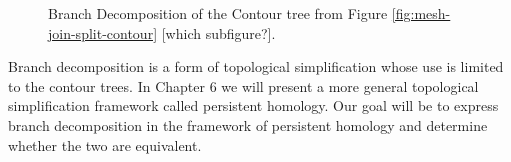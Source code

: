 \begin{figure}%
    \centering
    \caption{Branch Decomposition of the Contour tree from Figure \ref{fig:mesh-join-split-contour} [which subfigure?].}%
    \label{fig:branch-decomp}%
\end{figure}

Branch decomposition is a form of topological simplification whose use is limited to the contour trees. In Chapter 6 we will present a more general topological simplification framework called persistent homology. Our goal will be to express branch decomposition in the framework of persistent homology and determine whether the two are equivalent.


